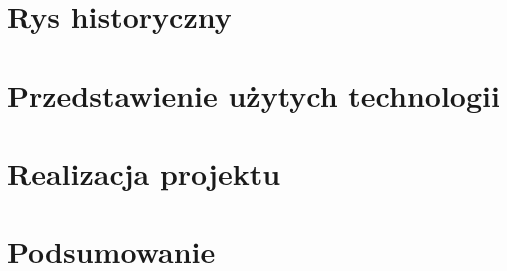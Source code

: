 \section{Rys historyczny}

\newpage

\section{Przedstawienie użytych technologii}

\newpage

\section{Realizacja projektu}

\newpage

\section{Podsumowanie}

\newpage